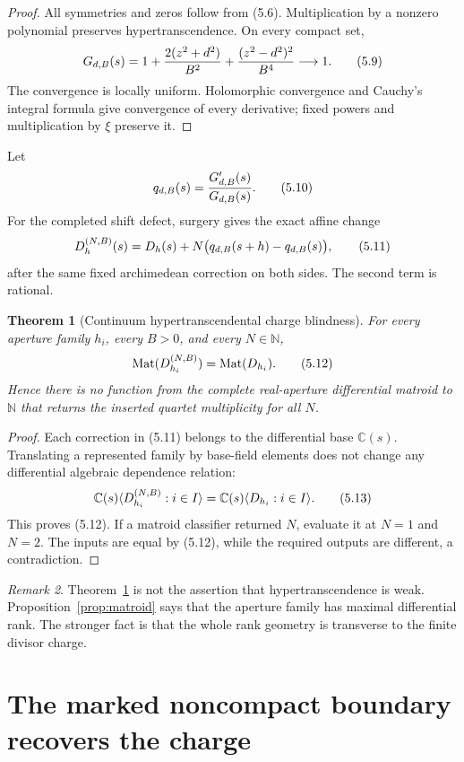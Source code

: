 \documentclass[11pt]{article}
\newtheorem{theorem}{Theorem}[section]
\theoremstyle{definition}
\theoremstyle{remark}
\newtheorem{remark}[theorem]{Remark}
\newcommand{\C}{\mathbb C}
\newcommand{\N}{\mathbb N}
\newcommand{\Mat}{\operatorname{Mat}}
\newcommand{\eqtag}[1]{\qquad\text{\upshape(#1)}}
\begin{document}
\begin{proof}
All symmetries and zeros follow from (5.6).  Multiplication by a nonzero
polynomial preserves hypertranscendence.  On every compact set,
\[
  G_{d,B}(s)
  =1+\frac{2(z^2+d^2)}{B^2}
    +\frac{(z^2-d^2)^2}{B^4}\longrightarrow1.        \eqtag{5.9}
\]
The convergence is locally uniform.  Holomorphic convergence and
Cauchy's integral formula give convergence of every derivative; fixed
powers and multiplication by \(\xi\) preserve it.
\end{proof}

Let
\[
  q_{d,B}(s)=\frac{G'_{d,B}(s)}{G_{d,B}(s)}.          \eqtag{5.10}
\]
For the completed shift defect, surgery gives the exact affine change
\[
 D_h^{(N,B)}(s)
 =D_h(s)+N\big(q_{d,B}(s+h)-q_{d,B}(s)\big),          \eqtag{5.11}
\]
after the same fixed archimedean correction on both sides.  The second
term is rational.

\begin{theorem}[Continuum hypertranscendental charge blindness]
\label{thm:blind}
For every aperture family \(h_i\), every \(B>0\), and every
\(N\in\N\),
\[
  \Mat(D_{h_i}^{(N,B)})=\Mat(D_{h_i}).                \eqtag{5.12}
\]
Hence there is no function from the complete real-aperture differential
matroid to \(\N\) that returns the inserted quartet multiplicity for all
\(N\).
\end{theorem}

\begin{proof}
Each correction in (5.11) belongs to the differential base
\(\C(s)\).  Translating a represented family by base-field elements
does not change any differential algebraic dependence relation:
\[
 \C(s)\langle D_{h_i}^{(N,B)}:i\in I\rangle
 =\C(s)\langle D_{h_i}:i\in I\rangle.                \eqtag{5.13}
\]
This proves (5.12).
If a matroid classifier returned \(N\), evaluate it at \(N=1\) and
\(N=2\).  The inputs are equal by (5.12), while the required outputs
are different, a contradiction.
\end{proof}

\begin{remark}
Theorem~\ref{thm:blind} is not the assertion that
hypertranscendence is weak.  Proposition~\ref{prop:matroid} says that
the aperture family has maximal differential rank.  The stronger fact
is that the whole rank geometry is transverse to the finite divisor
charge.
\end{remark}

\section{The marked noncompact boundary recovers the charge}
\end{document}
